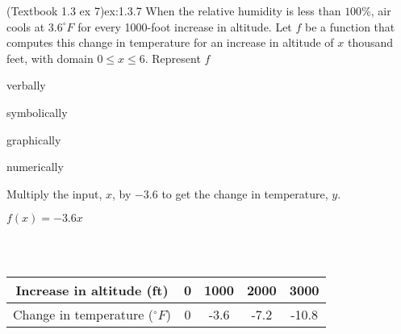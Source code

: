 \documentclass{article}
\begin{document}
\begin{example}{(Textbook 1.3 ex 7)}{ex:1.3.7}
    When the relative humidity is less than $100\%$, air cools at $3.6^\circ F$ for every 1000-foot increase in altitude. Let $f$ be a function that computes this change in temperature for an increase in altitude of $x$ thousand feet, with domain $0\leq x\leq 6$. Represent $f$
    \begin{problem}
        \item verbally
        \item symbolically
        \item graphically
        \item numerically
    \end{problem}
\end{example}
\begin{solution}
    \begin{problem}
        \item Multiply the input, $x$, by $-3.6$ to get the change in temperature, $y$.
        \item $f(x)=-3.6x$
        \item \,\begin{center}\end{center}
        \item $\quad$\\ \vspace{-30pt}\begin{center}\begin{tabular}{|c|c|c|c|c|} \hline
            Increase in altitude (ft) & 0 & 1000 & 2000 & 3000 \\ \hline
            Change in temperature ($^\circ F$) & 0 & -3.6 & -7.2 & -10.8 \\ \hline
        \end{tabular}\end{center}
    \end{problem}
\end{solution}
\end{document}
